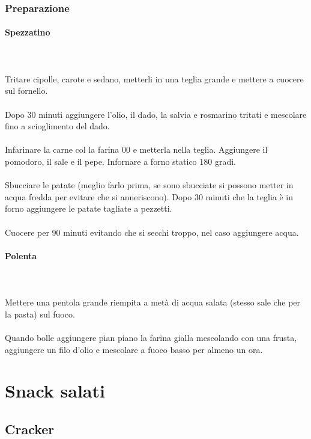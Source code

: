 \documentclass[12pt, a4paper]{article}
\begin{document}
\clearpage
\subsubsection{Preparazione}
	\paragraph{Spezzatino}\mbox{}\\\\ %
	Tritare cipolle, carote e sedano, metterli in una teglia grande
	e mettere a cuocere sul fornello.\\\\
	Dopo 30 minuti aggiungere l'olio, il dado, la salvia e rosmarino
	tritati e mescolare fino a scioglimento del dado.\\\\
	Infarinare la carne col la farina 00 e metterla nella teglia.
	Aggiungere il pomodoro, il sale e il pepe.
	Infornare a forno statico 180 gradi.\\\\
	Sbucciare le patate (meglio farlo prima, se sono sbucciate si
	possono metter in acqua fredda per evitare che si anneriscono).
	Dopo 30 minuti che la teglia è in forno aggiungere le patate
	tagliate a pezzetti.\\\\
	Cuocere per 90 minuti evitando che si secchi troppo, nel caso
	aggiungere acqua.
	\paragraph{Polenta}\mbox{}\\\\
	Mettere una pentola grande riempita
	a metà di acqua salata (stesso sale che per la pasta) sul fuoco.\\\\
	Quando bolle aggiungere pian piano la farina gialla mescolando
	con una frusta, aggiungere un filo d'olio e mescolare a fuoco
	basso per almeno un ora.
\clearpage

\section{Snack salati}

\subsection{Cracker}
\end{document}
